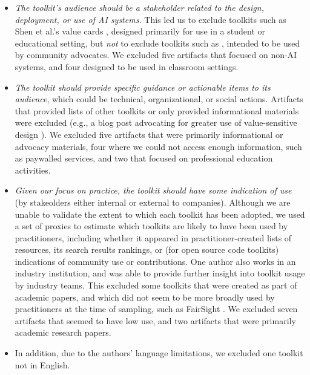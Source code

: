 \documentclass[acmsmall]{acmart}
\begin{document}
 \begin{itemize}
     \item \textit{The toolkit's audience should be a stakeholder related to the design, deployment, or use of AI systems.} This led us to exclude toolkits such as Shen et al.'s value cards \cite{shen2021valuecards}, designed primarily for use in a student or educational setting, but \textit{not} to exclude toolkits such as \citet{10.1145/3442188.3445938}, intended to be used by community advocates. 
        We excluded five artifacts that focused on non-AI systems, and four designed to be used in classroom settings.
     \item \textit{The toolkit should provide specific guidance or actionable items to its audience}, which could be technical, organizational, or social actions. Artifacts that provided lists of other toolkits or only provided informational materials were excluded (e.g., a blog post advocating for greater use of value-sensitive design \cite{Shonhiwa2020humanValuesMedium}). 
        We excluded five artifacts that were primarily informational or advocacy materials, four where we could not access enough information, such as paywalled services, and two that focused on professional education activities.
     \item \textit{Given our focus on practice, the toolkit should have some indication of use} (by stakeolders either internal or external to companies). Although we are unable to validate the extent to which each toolkit has been adopted, %
     we used a set of proxies to estimate which toolkits are likely to have been used by practitioners, including whether it appeared in practitioner-created lists of resources, its search results rankings, or (for open source code toolkits) indications of community use or contributions. One author also works in an industry institution, and was able to provide further insight into toolkit usage by industry teams. This excluded some toolkits that were created as part of academic papers, and which did not seem to be more broadly used by practitioners at the time of sampling, such as FairSight \cite{ahn2020fairsight}.  %
        We excluded seven artifacts that seemed to have low use, and two artifacts that were primarily academic research papers.
    \item In addition, due to the authors' language limitations, we excluded one toolkit not in English.
 \end{itemize}
 
\end{document}
